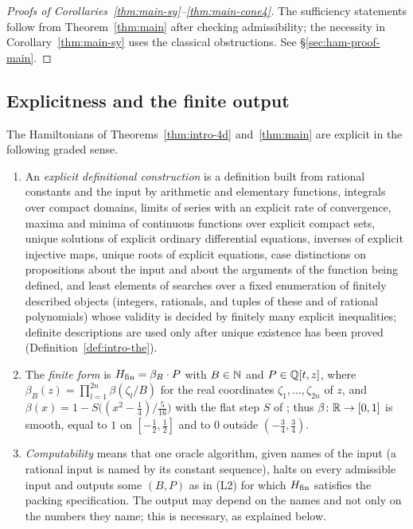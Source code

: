 \begin{proof}[Proofs of Corollaries~\ref{thm:main-sy}--\ref{thm:main-cone4}]
The sufficiency statements follow from Theorem~\ref{thm:main} after checking admissibility; the necessity in
Corollary~\ref{thm:main-sy} uses the classical obstructions. See \S\ref{sec:ham-proof-main}.
\end{proof}

\subsection{Explicitness and the finite output}\label{sec:intro-explicitness}

The Hamiltonians of Theorems~\ref{thm:intro-4d} and~\ref{thm:main} are explicit in the following graded sense.

\begin{definition}\label{def:intro-levels}
\begin{enumerate}[label=(L\arabic*)]
\item An \emph{explicit definitional construction} is a definition built from rational constants and the
 input by arithmetic and elementary functions, integrals over compact domains, limits of series with an
 explicit rate of convergence, maxima and minima of continuous functions over explicit compact sets,
 unique solutions of explicit ordinary differential equations, inverses of explicit injective maps,
 unique roots of explicit equations, case distinctions on propositions about the input and about the arguments of
 the function being defined, and least
 elements of searches over a fixed enumeration of finitely described objects (integers, rationals, and
 tuples of these and of rational polynomials) whose validity is decided by finitely many explicit
 inequalities; definite descriptions are used only after unique existence has been proved
 (Definition~\ref{def:intro-the}).
\item The \emph{finite form} is $H_{\mathrm{fin}}=\beta_B\cdot P$ with $B\in\mathbb{N}$ and $P\in\mathbb{Q}[t,z]$, where
 $\beta_B(z)=\prod_{l=1}^{2n}\beta(\zeta_l/B)$ for the real coordinates $\zeta_1,\dots,\zeta_{2n}$ of $z$,
 and $\beta(x)=1-S\big((x^2-\frac14)/\frac5{16}\big)$ with the flat step $S$ of
 ; thus $\beta\colon\mathbb{R}\to[0,1]$ is smooth, equal to $1$ on
 $[-\frac12,\frac12]$ and to $0$ outside $(-\frac34,\frac34)$.
\item \emph{Computability} means that one oracle algorithm, given names of the input (a rational input is named by
 its constant sequence), halts on every admissible input and outputs some $(B,P)$ as in (L2) for which $H_{\mathrm{fin}}$
 satisfies the packing specification. The output may depend on the names and not only on the numbers they name;
 this is necessary, as explained below.
\end{enumerate}
\end{definition}

